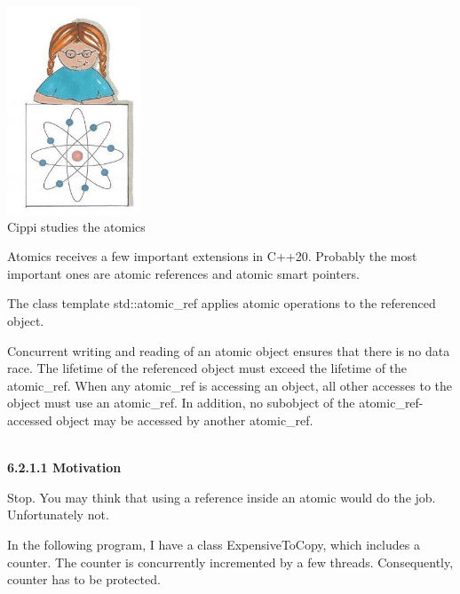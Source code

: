 \begin{center}
\includegraphics[width=0.3\textwidth]{content/3/chapter6/images/7.png}\\
Cippi studies the atomics
\end{center}

Atomics receives a few important extensions in C++20. Probably the most important ones are atomic references and atomic smart pointers.


The class template std::atomic\_ref applies atomic operations to the referenced object.

Concurrent writing and reading of an atomic object ensures that there is no data race. The lifetime of the referenced object must exceed the lifetime of the atomic\_ref. When any atomic\_ref is accessing an object, all other accesses to the object must use an atomic\_ref. In addition, no subobject of the atomic\_ref-accessed object may be accessed by another atomic\_ref.

\hspace*{\fill} \\ %
\noindent
\textbf{6.2.1.1\hspace{0.2cm} Motivation}

Stop. You may think that using a reference inside an atomic would do the job. Unfortunately not.

In the following program, I have a class ExpensiveToCopy, which includes a counter. The counter is concurrently incremented by a few threads. Consequently, counter has to be protected.

